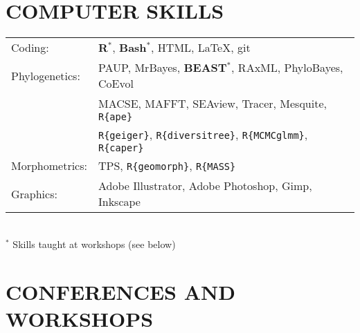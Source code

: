 \documentclass[10pt,a4paper]{article}
\begin{document}
{\section{COMPUTER SKILLS}
\begin{tabular}{ll}
Coding: & \textbf{{R}$^{*}$}, \textbf{Bash$^{*}$}, HTML, \LaTeX, git\\[1.5ex]
Phylogenetics: & PAUP, MrBayes, \textbf{BEAST$^{*}$}, RAxML, PhyloBayes, CoEvol \\
& MACSE, MAFFT, SEAview, Tracer, Mesquite, \texttt{R\{ape\}} \\
& \texttt{R\{geiger\}}, \texttt{R\{diversitree\}}, \texttt{R\{MCMCglmm\}}, \texttt{R\{caper\}} \\[1.5ex]
Morphometrics: & TPS, \texttt{R\{geomorph\}}, \texttt{R\{MASS\}} \\[1.5ex]
Graphics: & Adobe Illustrator, Adobe Photoshop, Gimp, Inkscape\\[1.5ex]
\end{tabular} \\
$^{*}$ Skills taught at workshops (see below)
\bigskip

\section{CONFERENCES AND WORKSHOPS}

}
\end{document}
